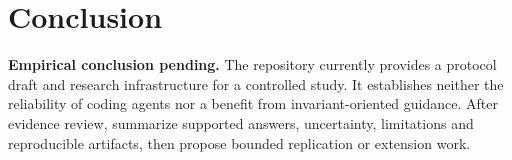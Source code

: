 \section{Conclusion}
\textbf{Empirical conclusion pending.} The repository currently provides a protocol draft and research
infrastructure for a controlled study. It establishes neither the reliability of coding agents nor a
benefit from invariant-oriented guidance. After evidence review, summarize supported answers, uncertainty,
limitations and reproducible artifacts, then propose bounded replication or extension work.
